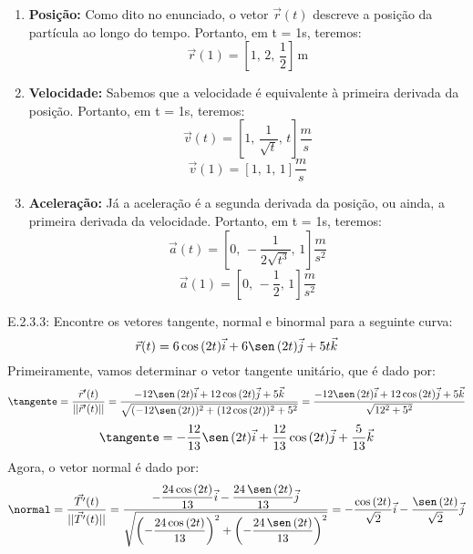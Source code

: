\begin{enumerate}
    \item\textbf{Posição:} Como dito no enunciado, o vetor $\vec r(t)$ descreve a posição da partícula ao longo do tempo. Portanto, em t = 1s, teremos:
    \begin{equation*}
    	\vec{r}(1)=\left[1,\,2,\,\dfrac{1}{2}\right]\,\text{m}
    \end{equation*}
    \item \textbf{Velocidade:} Sabemos que a velocidade é equivalente à primeira derivada da posição. Portanto, em t = 1s, teremos:
    \begin{equation*}
    	\vec{v}(t)=\left[1,\,\dfrac{1}{\sqrt{t}},\,t\right]\frac{m}{s}
    \end{equation*}
    \begin{equation*}
    	\vec{v}(1)=\left[1,\,1,\,1\right]\frac{m}{s}
    \end{equation*}
    \item \textbf{Aceleração:}
    Já a aceleração é a segunda derivada da posição, ou ainda, a primeira derivada da velocidade. Portanto, em t = 1s, teremos:
    \begin{equation*}
    \vec{a}(t)=\left[0,\,-\dfrac{1}{2\sqrt{t^3}},\,1\right]\frac{m}{s^2}
    \end{equation*}
    \begin{equation*}
    \vec{a}(1)=\left[0,\,-\dfrac{1}{2},\,1\right]\frac{m}{s^2}
    \end{equation*}
\end{enumerate}
E.2.3.3: Encontre os vetores tangente, normal e binormal para a seguinte curva:
\begin{equation*}
	\vec r(t)=6\cos\,(2t)\vec i+6\sen\,(2t)\vec j+5t\vec k
\end{equation*}
Primeiramente, vamos determinar o vetor tangente unitário, que é dado por:
\begin{equation*}
	\tangente=\dfrac{\vec r'(t)}{\vert\vert\vec r'(t)\vert\vert}=\dfrac{-12\sen\,(2t)\vec i+12\cos\,(2t)\vec j+5\vec k}{\sqrt{(-12\sen\,(2t))^2+(12\cos\,(2t))^2+5^2}}=\dfrac{-12\sen\,(2t)\vec i+12\cos\,(2t)\vec j+5\vec k}{\sqrt{12^2+5^2}}
\end{equation*}
\begin{equation*}
	\tangente=-\dfrac{12}{13}\sen\,(2t)\vec i+\dfrac{12}{13}\cos\,(2t)\vec j+\dfrac{5}{13}\vec k
\end{equation*}
Agora, o vetor normal é dado por:
\begin{equation*}
	\normal=\dfrac{\vec{T'}(t)}{\vert\vert\vec{T'}(t)\vert\vert}=\dfrac{-\dfrac{24\cos\,(2t)}{13}\vec i-\dfrac{24\,\sen\,(2t)}{13}\vec j}{\sqrt{\left(-\dfrac{24\cos\,(2t)}{13}\right)^2+\left(-\dfrac{24\,\sen\,(2t)}{13}\right)^2}}=-\dfrac{\cos\,(2t)}{\sqrt{2}}\vec i-\dfrac{\sen\,(2t)}{\sqrt{2}}\vec j
\end{equation*}
